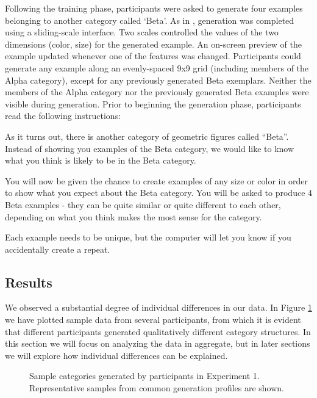 \documentclass[12pt]{article}
\newcommand\inputpgf[2]{{
\let\pgfimageWithoutPath\pgfimage
\renewcommand{\pgfimage}[2][]{\pgfimageWithoutPath[##1]{#1/##2}}

}}
\begin{document}
\begin{flushleft}
Following the training phase, participants were asked to generate four examples
belonging to another category called `Beta'. As in
\citet{jern2013probabilistic}, generation was completed using a sliding-scale
interface. Two scales controlled the values of the two dimensions (color, size)
for the generated example. An on-screen preview of the example updated whenever
one of the features was changed. Participants could generate any example along
an evenly-spaced 9x9 grid (including members of the Alpha category), except for
any previously generated Beta exemplars. Neither the members of the Alpha
category nor the previously generated Beta examples were visible during
generation. Prior to beginning the generation phase, participants read the
following instructions:

\begin{displayquote} As it turns out, there is another category of geometric
figures called ``Beta''. Instead of showing you examples of the Beta category,
we would like to know what you think is likely to be in the Beta category.

You will now be given the chance to create examples of any size or color in
order to show what you expect about the Beta category. You will be asked to
produce 4 Beta examples - they can be quite similar or quite different to each
other, depending on what you think makes the most sense for the category.

Each example needs to be unique, but the computer will let you know if you
accidentally create a repeat.
\end{displayquote}

\subsection{Results}

We observed a substantial degree of individual differences in our data. In
Figure \ref{fig:e1-samples} we have plotted sample data from several
participants, from which it is evident that different participants generated
qualitatively different category structures. In this section we will focus on
analyzing the data in aggregate, but in later sections we will explore how
individual differences can be explained.

\begin{figure}
    \begin{center} \inputpgf{figs/}{e1-samples.pgf}
    \caption{Sample categories generated by participants in Experiment 1.
Representative samples from common generation profiles are shown.}
    \label{fig:e1-samples}
    \end{center}
\end{figure}


\end{flushleft}
\end{document}
